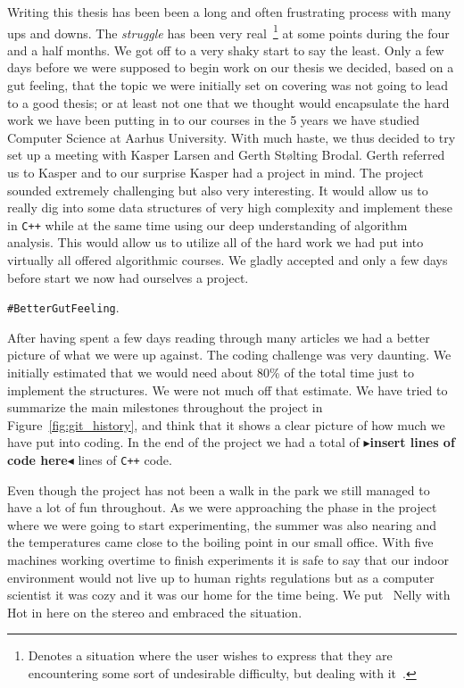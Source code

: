 \documentclass[twoside,11pt,openright]{report}
\newcommand{\todo}[1]{{\color[rgb]{.5,0,0}\textbf{$\blacktriangleright$#1$\blacktriangleleft$}}}
\begin{document}
Writing this thesis has been been a long and often frustrating process with many ups and downs. The \textit{struggle} has been very real~\footnote{Denotes a situation where the user wishes to express that they are encountering some sort of undesirable difficulty, but dealing with it~\cite{real_struggle}.} at some points during the four and a half months. We got off to a very shaky start to say the least. Only a few days before we were supposed to begin work on our thesis we decided, based on a gut feeling, that the topic we were initially set on covering was not going to lead to a good thesis; or at least not one that we thought would encapsulate the hard work we have been putting in to our courses in the 5 years we have studied Computer Science at Aarhus University. With much haste, we thus decided to try set up a meeting with Kasper Larsen and Gerth St\o lting Brodal. Gerth referred us to Kasper and to our surprise Kasper had a project in mind. The project sounded extremely challenging but also very interesting. It would allow us to really dig into some  data structures of very high complexity and implement these in \texttt{C++} while at the same time using our deep understanding of algorithm analysis. This would allow us to utilize all of the hard work we had put into virtually all offered algorithmic courses. We gladly accepted and only a few days before start we now had ourselves a project.
\begin{center}
\texttt{\#BetterGutFeeling}.
\end{center}
After having spent a few days reading through many articles we had a better picture of what we were up against. The coding challenge was very daunting. We initially estimated that we would need about 80\% of the total time just to implement the structures. We were not much off that estimate. We have tried to summarize the main milestones throughout the project in Figure~\ref{fig:git_history}, and think that it shows a clear picture of how much we have put into coding. In the end of the project we had a total of \todo{insert lines of code here} lines of \texttt{C++} code.

Even though the project has not been a walk in the park we still managed to have a lot of fun throughout. As we were approaching the phase in the project where we were going to start experimenting, the summer was also nearing and the temperatures came close to the boiling point in our small office. With five machines working overtime to finish experiments it is safe to say that our indoor environment would not live up to human rights regulations but as a computer scientist it was cozy and it was our home for the time being. We put \twonotes~Nelly with Hot in here  on the stereo and embraced the situation.
\end{document}
